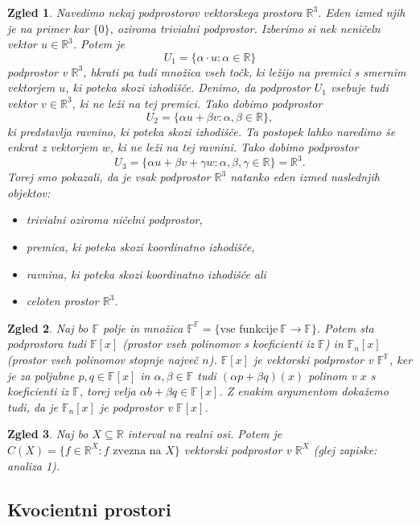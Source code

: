 \documentclass[10pt, a4paper]{article}
\newtheorem{zgled}{Zgled}[section]
\newcommand{\R}{\mathbb {R}}
\newcommand{\F}{\mathbb {F}}
\begin{document}
\begin{zgled}
    Navedimo nekaj podprostorov vektorskega prostora $\R^3$. 
    Eden izmed njih je na primer kar $\{0\}$, oziroma trivialni podprostor.
    Izberimo si nek neničeln vektor $u \in \R^3$.
    Potem je $$U_1= \{\alpha \cdot u: \alpha \in \R\}$$ podprostor v $\R^3$, 
    hkrati pa tudi množica vseh točk, ki ležijo na premici s smernim vektorjem $u$, ki poteka skozi izhodišče.
    Denimo, da podprostor $U_1$ vsebuje tudi vektor $v \in \R^3$, ki ne leži na tej premici.
    Tako dobimo podprostor $$U_2 = \{\alpha u + \beta v: \alpha,\beta \in \R\},$$ ki predstavlja ravnino, ki poteka skozi izhodišče.
    Ta postopek lahko naredimo še enkrat z vektorjem $w$, ki ne leži na tej ravnini. 
    Tako dobimo podprostor $$U_3 = \{\alpha u + \beta v + \gamma w: \alpha, \beta, \gamma \in \R\} = \R^3.$$
    Torej smo pokazali, da je vsak podprostor $\R^3$ natanko eden izmed naslednjih objektov:
    \begin{itemize}
        \item trivialni oziroma ničelni podprostor,
        \item premica, ki poteka skozi koordinatno izhodišče,
        \item ravnina, ki poteka skozi koordinatno izhodišče ali
        \item celoten prostor $\R^3$.
    \end{itemize}
\end{zgled}

\begin{zgled}
    Naj bo $\F$ polje in množica $\F^\F = \{\text{vse funkcije}\ \F \rightarrow \F\}.$ 
    Potem sta podprostora tudi $\F[x]$ (prostor vseh polinomov s koeficienti iz $\F$) in $\F_n [x]$ (prostor vseh polinomov stopnje največ $n$).
    $\F[x]$ je vektorski podprostor v $\F^\F$, ker je za poljubne $p,q \in \F[x]$ in $\alpha, \beta \in \F$ tudi $(\alpha p + \beta q)(x)$ polinom v $x$ s koeficienti iz $\F$, torej velja $\alpha b + \beta q \in \F[x]$.
    Z enakim argumentom dokažemo tudi, da je $\F_n [x]$ je podprostor v $\F[x]$.
\end{zgled}

\begin{zgled}
    Naj bo $X \subseteq \R$ interval na realni osi. Potem je $C(X) = \{f \in \R^X: f \text{ zvezna na } X\}$ vektorski podprostor v $\R^X$ (glej zapiske: analiza 1).
\end{zgled}

\subsection{Kvocientni prostori}
\end{document}
